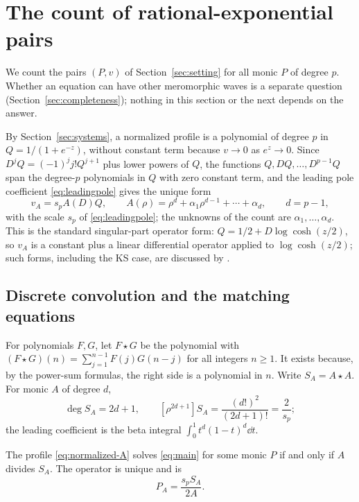 \section{The count of rational-exponential pairs}\label{sec:counting}

We count the pairs \((P,v)\) of Section~\ref{sec:setting} for all monic
\(P\) of degree \(p\). Whether an equation can have other meromorphic
waves is a separate question (Section~\ref{sec:completeness}); nothing
in this section or the next depends on the answer.

By Section~\ref{sec:systems}, a normalized profile is a polynomial of
degree \(p\) in \(Q=1/(1+e^{-z})\), without constant term because
\(v\to0\) as \(e^z\to0\). Since \(D^jQ=(-1)^j j!Q^{j+1}\) plus lower
powers of \(Q\), the functions \(Q,DQ,\ldots,D^{p-1}Q\) span the
degree-\(p\) polynomials in \(Q\) with zero constant term, and the
leading pole coefficient \eqref{eq:leadingpole} gives the unique form
\begin{equation}\label{eq:normalized-A}
 v_A=s_pA(D)Q,\qquad
 A(\rho)=\rho^d+\alpha_1\rho^{d-1}+\cdots+\alpha_d,\qquad d=p-1,
\end{equation}
with the scale \(s_p\) of \eqref{eq:leadingpole}; the unknowns of the
count are \(\alpha_1,\ldots,\alpha_d\). This is the standard
singular-part operator form: \(Q=1/2+D\log\cosh(z/2)\), so \(v_A\) is a
constant plus a linear differential operator applied to
\(\log\cosh(z/2)\); such forms, including the KS case, are discussed by
\citet{ConteMusette2003}.

\subsection{Discrete convolution and the matching equations}

For polynomials \(F,G\), let \(F\star G\) be the polynomial with
\((F\star G)(n)=\sum_{j=1}^{n-1}F(j)G(n-j)\) for all integers \(n\ge1\).
It exists because, by the power-sum formulas, the right side is a
polynomial in \(n\). Write \(S_A=A\star A\). For monic \(A\) of degree
\(d\),
\begin{equation}\label{eq:Sleading}
 \deg S_A=2d+1,\qquad
 [\rho^{2d+1}]S_A=\frac{(d!)^2}{(2d+1)!}=\frac{2}{s_p};
\end{equation}
the leading coefficient is the beta integral \(\int_0^1t^d(1-t)^d\dd t\).

\begin{proposition}\label{prop:divisibility}
The profile \eqref{eq:normalized-A} solves \eqref{eq:main} for some
monic \(P\) if and only if \(A\) divides \(S_A\).
The operator is unique and is
\begin{equation}\label{eq:operator-A}
 P_A=\frac{s_pS_A}{2A}.
\end{equation}
\end{proposition}

